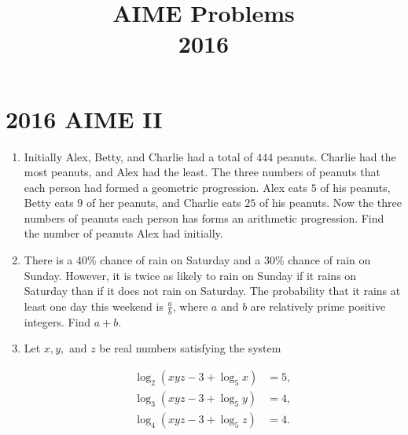 \documentclass{article}
\title{AIME Problems \\ 2016}
\date{}
\begin{document}
\maketitle\thispagestyle{fancy}\newpage\section*{2016 AIME II}\begin{enumerate}[label=\arabic*., itemsep=0.5em]\item Initially Alex, Betty, and Charlie had a total of \(444\) peanuts. Charlie had the most peanuts, and Alex had the least. The three numbers of peanuts that each person had formed a geometric progression. Alex eats \(5\) of his peanuts, Betty eats \(9\) of her peanuts, and Charlie eats \(25\) of his peanuts. Now the three numbers of peanuts each person has forms an arithmetic progression. Find the number of peanuts Alex had initially.\par \vspace{0.5em}\item There is a \(40\%\) chance of rain on Saturday and a \(30\%\) chance of rain on Sunday. However, it is twice as likely to rain on Sunday if it rains on Saturday than if it does not rain on Saturday. The probability that it rains at least one day this weekend is \(\frac{a}{b}\), where \(a\) and \(b\) are relatively prime positive integers. Find \(a+b\).\par \vspace{0.5em}\item Let \(x,y,\) and \(z\) be real numbers satisfying the system

\begin{align*}
\log_2(xyz-3+\log_5 x)&=5,\\
\log_3(xyz-3+\log_5 y)&=4,\\
\log_4(xyz-3+\log_5 z)&=4.
\end{align*}


\end{enumerate}
\end{document}

